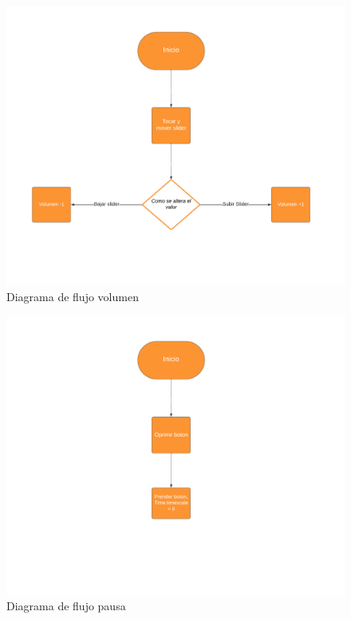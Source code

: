 \documentclass[12pt]{article} %
\begin{document}
\begin{figure}  [!htb]
  \includegraphics[width=\linewidth]{flujo8.png}
  \caption{Diagrama de flujo volumen}
\end{figure}

\begin{figure}  [!htb]
  \includegraphics[width=\linewidth]{flujo9.png}
  \caption{Diagrama de flujo pausa}
\end{figure}
\end{document}
